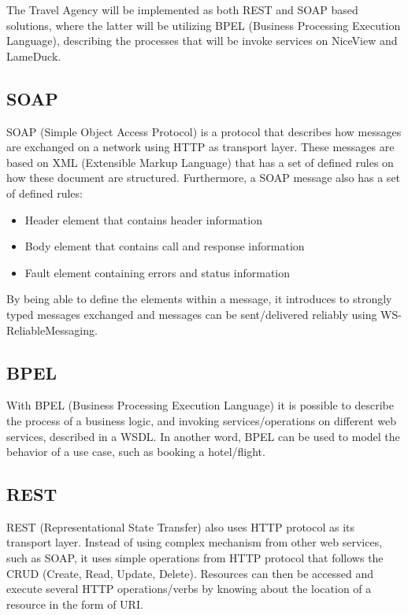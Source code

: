 The Travel Agency will be implemented as both REST and SOAP based solutions, where the latter will be utilizing BPEL (Business Processing Execution Language), describing the processes that will be invoke services on NiceView and LameDuck.

\subsection{SOAP}
\label{sub:SOAP}
SOAP (Simple Object Access Protocol) is a protocol that describes how messages are exchanged on a network using HTTP as transport layer. These messages are based on XML (Extensible Markup Language) that has a set of defined rules on how these document are structured. Furthermore, a SOAP message also has a set of defined rules:

\begin{itemize}
  \item Header element that contains header information
  \item Body element that contains call and response information
  \item Fault element containing errors and status information
\end{itemize}

By being able to define the elements within a message, it introduces to strongly typed messages exchanged and messages can be sent/delivered reliably using WS-ReliableMessaging.

\subsection{BPEL}
\label{sub:BPEL}
With BPEL (Business Processing Execution Language) it is possible to describe the process of a business logic, and invoking services/operations on different web services, described in a WSDL. In another word, BPEL can be used to model the behavior of a use case, such as booking a hotel/flight.

\subsection{REST}
\label{sub:REST}
REST (Representational State Transfer) also uses HTTP protocol as its transport layer. Instead of using complex mechanism from other web services, such as SOAP, it uses simple operations from HTTP protocol that follows the CRUD (Create, Read, Update, Delete). Resources can then be accessed and execute several HTTP operations/verbs by knowing about the location of a resource in the form of URI.




